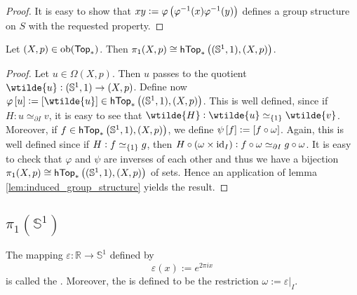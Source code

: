 \begin{proof}
	It is easy to show that $xy := \varphi\del[1]{\varphi^{-1}(x)\varphi^{-1}(y)}$ defines a group structure on $S$ with the requested property.
\end{proof}

\begin{proposition}
	Let $(X,p) \in \operatorname{ob}(\mathsf{Top}_\ast)$. Then $\pi_1(X,p) \cong \mathsf{hTop}_\ast\del[1]{(\mathbb{S}^1,1),(X,p)}$.
\end{proposition}

\begin{proof}
	Let $u \in \Omega(X,p)$. Then $u$ passes to the quotient $\wtilde{u} : (\mathbb{S}^1,1) \to (X,p)$. Define now $\varphi\sbr{u} := \sbr[0]{\wtilde{u}} \in \mathsf{hTop}_\ast\del[1]{(\mathbb{S}^1,1),(X,p)}$. This is well defined, since if $H : u \simeq_{\partial I} v$, it is easy to see that $\wtilde{H} : \wtilde{u} \simeq_{\cbr{1}} \wtilde{v}$. Moreover, if $f \in \mathsf{hTop}_\ast\del[1]{\mathbb{S}^1,1),(X,p)}$, we define $\psi\sbr[0]{f} := \sbr[0]{f \circ \omega}$. Again, this is well defined since if $H : f \simeq_{\cbr{1}} g$, then $H \circ (\omega \times \operatorname{id}_I) : f \circ \omega \simeq_{\partial I} g \circ \omega$. It is easy to check that $\varphi$ and $\psi$ are inverses of each other and thus we have a bijection $\pi_1(X,p) \cong \mathsf{hTop}_\ast\del[1]{(\mathbb{S}^1,1),(X,p)}$ of sets. Hence an application of lemma \ref{lem:induced_group_structure} yields the result.	
\end{proof}

\subsection*{$\pi_1(\mathbb{S}^1)$}  

\begin{definition}
	The mapping $\varepsilon : \mathbb{R} \to \mathbb{S}^1$ defined by
	\begin{equation}
		\varepsilon(x) := e^{2\pi i x}
	\end{equation}
	\noindent is called the . Moreover, the  is  defined to be the restriction $\omega := \varepsilon\vert_I$.
\end{definition}

